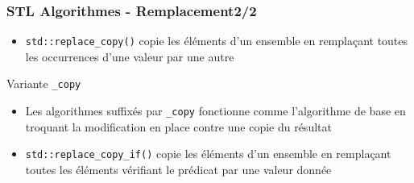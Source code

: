 \documentclass[C++.tex]{subfiles}
\begin{document}
\begin{frame}[fragile]
	\frametitle{STL Algorithmes - Remplacement\titlehfill{}2/2}
	\begin{itemize}
		\item \lstinline|std::replace_copy()| copie les éléments d'un ensemble en remplaçant toutes les occurrences d'une valeur par une autre
	\end{itemize}

	\begin{block}{Variante \og \lstinline|_copy|\fg{}}
		\begin{itemize}
			\item Les algorithmes suffixés par \lstinline|_copy| fonctionne comme l'algorithme de base en troquant la modification en place contre une copie du résultat
		\end{itemize}
	\end{block}

	\begin{itemize}
		\item \lstinline|std::replace_copy_if()| copie les éléments d'un ensemble en remplaçant toutes les éléments vérifiant le prédicat par une valeur donnée
	\end{itemize}
\end{frame}
\end{document}
